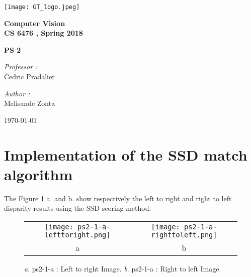\documentclass[a4paper,11pt]{article}
\begin{document}

\begin{titlepage}

\begin{center}
\texttt{[image: GT\_logo.jpeg]}
\end{center}
\hrulefill
\begin{center}\bfseries\huge
   Computer Vision \\
   CS 6476 , Spring 2018\\
   \end{center}
  \begin{center}\bfseries\large
     PS 2\\
    \hrulefill
\end{center}
\vspace*{1cm}
\begin{minipage}[t]{0.6\textwidth}
  \begin{flushleft} \large
    \emph{Professor : }\\
    Cedric Pradalier \\
  \end{flushleft}
\end{minipage}
\begin{minipage}[t]{0.3\textwidth}
  \begin{flushright} \large
    \emph{Author :} \\
    Melisande Zonta \\
  \end{flushright}
\end{minipage}
\begin{flushright}
       \today 
\end{flushright} 
\end{titlepage}

\tableofcontents
\clearpage

\section{Implementation of the SSD match algorithm}

The Figure 1 a. and b. show respectively the left to right and right to left disparity results using the SSD scoring method.

 \begin{figure}[H]
\begin{center}
\begin{tabular}{cc}
	\texttt{[image: ps2-1-a-lefttoright.png]}&
	\texttt{[image: ps2-1-a-righttoleft.png]}\\
	a&b
\end{tabular}
\end{center}
\caption{ 
\textit{a}. ps2-1-a : Left to right Image.  \textit{b}. ps2-1-a : Right to left Image. }
\label{ps2-1}
\end{figure}
\end{document}
